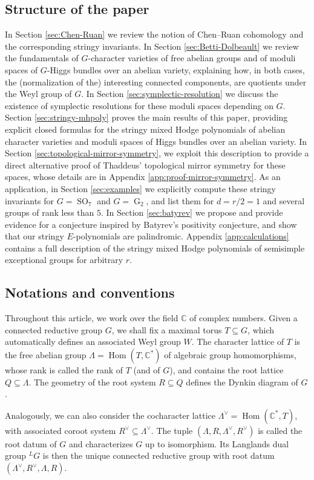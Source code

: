\documentclass[11pt,english]{amsart}
\numberwithin{equation}{section}
\numberwithin{figure}{section}
\theoremstyle{plain}
\theoremstyle{plain}
\theoremstyle{definition}
\theoremstyle{remark}
\newcommand{\CC}{\mathbb{C}}
\newcommand{\Hom}{\operatorname{Hom}}
\newcommand{\SO}{\operatorname{SO}}
\newcommand{\G}{\operatorname{G}}
\begin{document}
\subsection*{Structure of the paper} In Section \ref{sec:Chen-Ruan} we review the notion of Chen--Ruan cohomology and the corresponding stringy invariants. In Section \ref{sec:Betti-Dolbeault} we review the fundamentals of $G$-character varieties of free abelian groups and of moduli spaces of $G$-Higgs bundles over an abelian variety, explaining how, in both cases, the (normalization of the) interesting connected components, are quotients under the Weyl group of $G$. In Section \ref{sec:symplectic-resolution} we discuss the existence of symplectic resolutions for these moduli spaces depending on $G$. Section \ref{sec:stringy-mhpoly} proves the main results of this paper, providing explicit closed formulas for the stringy mixed Hodge polynomials of abelian character varieties and moduli spaces of Higgs bundles over an abelian variety. In Section \ref{sec:topological-mirror-symmetry}, we exploit this description to provide a direct alternative proof of Thaddeus' topological mirror symmetry for these spaces, whose details are in Appendix \ref{app:proof-mirror-symmetry}. As an application, in Section \ref{sec:examples} we explicitly compute these stringy invariants for $G = \SO_7$ and $G = \G_2$, and list them for $d=r/2=1$ and several groups of rank less than $5$. In Section \ref{sec:batyrev} we propose and provide evidence for a conjecture inspired by Batyrev's positivity conjecture, and show that our stringy $E$-polynomials are palindromic. Appendix \ref{app:calculations} contains a full description of the stringy mixed Hodge polynomials of semisimple exceptional groups for arbitrary $r$.

\subsection*{Notations and conventions}
Throughout this article, we work over the field $\CC$ of complex numbers. Given a connected reductive group $G$, we shall fix a maximal torus $T \subseteq G$, which automatically defines an associated Weyl group $W$. The character lattice of $T$ is the free abelian group $\Lambda = \Hom(T, \CC^*)$ of algebraic group homomorphisms, whose rank is called the rank of $T$ (and of $G$), and contains the root lattice $Q \subseteq \Lambda$. The geometry of the root system $R \subseteq Q$ defines the Dynkin diagram of $G$.

Analogously, we can also consider the cocharacter lattice $\Lambda^\vee = \Hom(\CC^*, T)$, with associated coroot system $R^\vee \subseteq \Lambda^\vee$. The tuple $(\Lambda, R, \Lambda^\vee, R^\vee)$ is called the root datum of $G$ and characterizes $G$ up to isomorphism. Its Langlands dual group $^L G$ is then the unique connected reductive group with root datum $(\Lambda^\vee, R^\vee, \Lambda, R)$.
\end{document}
